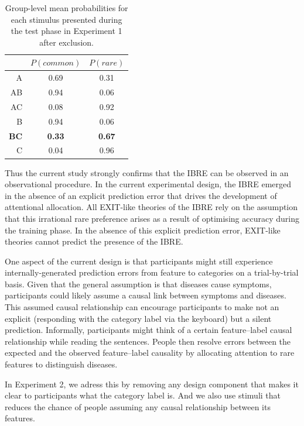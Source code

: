 \documentclass[10pt,letterpaper]{article}
\begin{document}
\begin{table}[ht]
  \begin{center}
    \caption{Group-level mean probabilities for each stimulus presented during the test phase in Experiment 1 after exclusion. \\}
    \label{tab:results-exp1}
    \vskip 0.12in
    \begin{tabular}{rcc}
      \hline
      & $P(common)$ & $P(rare)$ \\
      \hline
      A & 0.69 & 0.31 \\
      AB & 0.94 & 0.06 \\
      AC & 0.08 & 0.92 \\
      B & 0.94 & 0.06 \\
      \textbf{BC} & \textbf{0.33} & \textbf{0.67} \\
      C & 0.04 & 0.96 \\
    \end{tabular}
  \end{center}
\end{table}

Thus the current study strongly confirms that the IBRE can be observed in an observational procedure.
In the current experimental design, the IBRE emerged in the absence of an explicit prediction error that drives the development of attentional allocation.
All EXIT-like theories of the IBRE rely on the assumption that this irrational rare preference arises as a result of optimising accuracy during the training phase.
In the absence of this explicit prediction error, EXIT-like theories cannot predict the presence of the IBRE.

One aspect of the current design is that participants might still experience internally-generated prediction errors from feature to categories on a trial-by-trial basis.
Given that the general assumption is that diseases cause symptoms, participants could likely assume a causal link between symptoms and diseases.
This assumed causal relationship can encourage participants to make not an explicit (responding with the category label via the keyboard) but a silent prediction.
Informally, participants might think of a certain feature--label causal relationship while reading the sentences.
People then resolve errors between the expected and the observed feature--label causality by allocating attention to rare features to distinguish diseases.

In Experiment 2, we adress this by removing any design component that makes it clear to participants what the category label is.
And we also use stimuli that reduces the chance of people assuming any causal relationship between its features.
\end{document}
